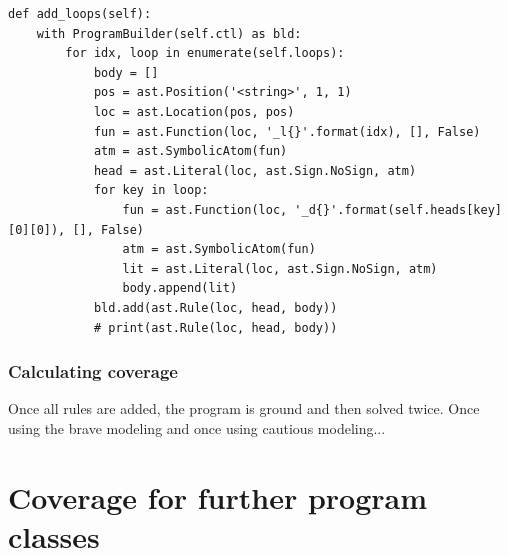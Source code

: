 \begin{lstlisting}[float,caption={Function implementing the loop coverage transformation},label=lst:find_loops]
def add_loops(self):
    with ProgramBuilder(self.ctl) as bld:
        for idx, loop in enumerate(self.loops):
            body = []
            pos = ast.Position('<string>', 1, 1)
            loc = ast.Location(pos, pos)
            fun = ast.Function(loc, '_l{}'.format(idx), [], False)
            atm = ast.SymbolicAtom(fun)
            head = ast.Literal(loc, ast.Sign.NoSign, atm)
            for key in loop:
                fun = ast.Function(loc, '_d{}'.format(self.heads[key][0][0]), [], False)
                atm = ast.SymbolicAtom(fun)
                lit = ast.Literal(loc, ast.Sign.NoSign, atm)
                body.append(lit)
            bld.add(ast.Rule(loc, head, body))
            # print(ast.Rule(loc, head, body))

\end{lstlisting}

\subsection{Calculating coverage}
\label{subsec:Computing coverage metrics for propositional programs/Implementation details/Calculating coverage}
Once all rules are added, the program is ground and then solved twice. Once using the brave modeling and once using cautious modeling...

\chapter{Coverage for further program classes}
\label{ch:Coverage for further program classes}


